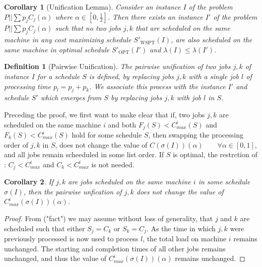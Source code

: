 \documentclass[11pt]{article}
\newtheorem{corollary}{Corollary}
\newtheorem{definition}{Definition}
\newcommand{\WSPT}{\mathrm{WSPT}}
\newcommand{\OPT}{\mathrm{OPT}}
\begin{document}
\begin{corollary}[Unification Lemma]
    Consider an instance $I$ of the problem $P||\sum p_jC_j(\alpha)$ where $\alpha \in [0,\frac12]$. 
    Then there exists an instance $I'$ of the problem $P||\sum p_jC_j(\alpha)$ such that no two jobs 
    $j,k$ that are scheduled on the same machine in any cost maximizing schedule $S'_{\WSPT}(I)$, are also 
    scheduled on the same machine in optimal schedule $S'_{\OPT}(I')$ and $\lambda(I)\le\lambda(I')$. 

\end{corollary}

\begin{definition}[Pairwise Unification]
    The pairwise unification of two jobs $j,k$ of instance $I$ for a schedule $S$ is defined, by replacing jobs $j,k$
    with a single job $l$ of 
    processing time $p_l=p_j+p_k$. We associate this process with the instance $I'$ and schedule $S'$ 
    which emerges from $S$ by replacing jobs $j,k$ with job $l$ in $S$.
\end{definition}

Preceding the proof, we first want to make clear that 
if, two jobs $j,k$ are scheduled on the same machine $i$ and both $F_{j}(S) < C_{max}^{i}(S)$ and 
$F_{k}(S) < C_{max}^{i}(S)$ hold for some schedule $S$,
then swapping the processing order of $j,k$ in $S$, does not change the value of $C(\sigma(I))(\alpha) \qquad \forall \alpha \in [0,1]$,
and all jobs remain scheeduled in some list order.
If $S$ is optimal, the restrction of : $C_{j} < C_{max}^{i}$ and $C_{k} < C_{max}^{i}$ is not needed. 


\begin{corollary}
    If $j,k$ are jobs scheduled on the same machine $i$ in some schedule $\sigma(I)$, then the pairwise unfication
    of $j,k$ does not change the value of $C^{i}_{max}(\sigma(I))(\alpha)$.

\end{corollary}

\begin{proof}
    From ("fact") we may assume without loss of generality, that $j$ and $k$ are scheduled such that either $S_{j} = C_{k}$ or $S_{k} = C_{j}$.
    As the time in which $j,k$ were previously processed is now used to process $l$, the total load on machine $i$ remains unchanged.
    The starting and completion times of all other jobs remains unchanged, and thus the value of $C^{i}_{max}(\sigma(I))(\alpha)$ remains unchanged.
\end{proof}
\end{document}
